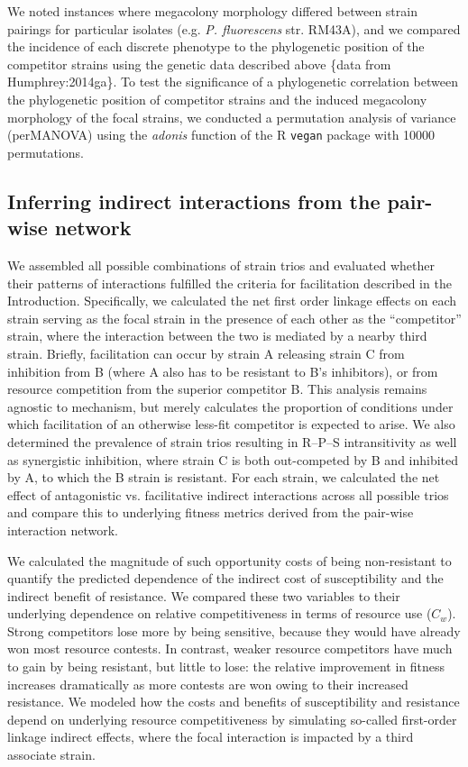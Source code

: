 \documentclass[%
preprint,
superscriptaddress,
 amsmath,amssymb,
 aps,
]{revtex4-1}
\begin{document}
We noted instances where megacolony morphology differed between strain
pairings for particular isolates (e.g. \emph{P. fluorescens} str.
RM43A), and we compared the incidence of each discrete phenotype to the
phylogenetic position of the competitor strains using the genetic data
described above \{data from Humphrey:2014ga\}. To test the significance
of a phylogenetic correlation between the phylogenetic position of
competitor strains and the induced megacolony morphology of the focal
strains, we conducted a permutation analysis of variance (perMANOVA)
using the \emph{adonis} function of the R \texttt{vegan} package with
10000 permutations.

\subsection*{Inferring indirect interactions from the pair-wise network}

We assembled all possible combinations of strain trios and evaluated
whether their patterns of interactions fulfilled the criteria for
facilitation described in the Introduction. Specifically, we calculated
the net first order linkage effects on each strain serving as the focal
strain in the presence of each other as the ``competitor'' strain, where
the interaction between the two is mediated by a nearby third strain.
Briefly, facilitation can occur by strain A releasing strain C from
inhibition from B (where A also has to be resistant to B's inhibitors),
or from resource competition from the superior competitor B. This
analysis remains agnostic to mechanism, but merely calculates the
proportion of conditions under which facilitation of an otherwise
less-fit competitor is expected to arise. We also determined the
prevalence of strain trios resulting in R--P--S intransitivity as well
as synergistic inhibition, where strain C is both out-competed by B and
inhibited by A, to which the B strain is resistant. For each strain, we
calculated the net effect of antagonistic vs. facilitative indirect
interactions across all possible trios and compare this to underlying
fitness metrics derived from the pair-wise interaction network.

We calculated the magnitude of such opportunity costs of being non-resistant to quantify the predicted dependence of the indirect cost of susceptibility and the indirect benefit of resistance. We compared these two variables to their underlying dependence on relative competitiveness in terms of resource use ($C_w$). Strong competitors lose more by being sensitive, because they would have already won most resource contests. In contrast, weaker resource competitors have much to gain by being resistant, but little to lose: the relative improvement in fitness increases dramatically as more contests are won owing to their increased resistance. We modeled how the costs and benefits of susceptibility and resistance depend on underlying resource competitiveness by simulating so-called first-order linkage indirect effects, where the focal interaction is impacted by a third associate strain.
\end{document}
